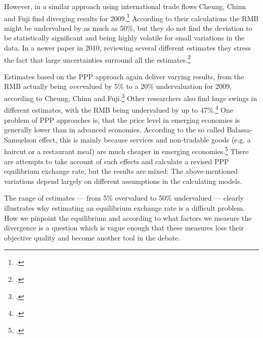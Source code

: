 However, in a similar approach using international trade flows Cheung, 
Chinn and Fuji find diverging results for 
2009.\footnote{\cite{Cheung2009}.} According to their calculations the 
RMB might be undervalued by as much as 50\%, but they do not find the 
deviation to be statistically significant and being highly volatile for 
small variations in the data. In a newer paper in 2010, reviewing 
several different estimates they stress the fact that large 
uncertainties surround all the estimates.\footnote{\cite{Cheung2010}.}

Estimates based on the PPP approach again deliver varying results, from 
the RMB actually being \emph{over}valued by 5\% to a 20\% undervaluation 
for 2009, according to Cheung, Chinn and Fuji.\footnote{\cite[pp.  
82]{Cheung2010}.} Other researchers also find huge swings in different 
estimates, with the RMB being undervalued by up to 
47\%.\footnote{\cite[pp. 72]{Subramanian2010}.} One problem of PPP 
approaches is, that the price level in emerging economies is generally 
lower than in advanced economies. According to the so called 
Balassa-Samuelson effect, this is mainly because services and 
non-tradable goods (e.g. a haircut or a restaurant meal) are much 
cheaper in emerging economies.\footnote{\cite[pp. 57]{Frankel2010}.} 
There are attempts to take account of such effects and calculate a 
revised PPP equilibrium exchange rate, but the results are mixed: The 
above-mentioned variations depend largely on different assumptions in 
the calculating models.

The range of estimates --- from 5\% overvalued to 50\% undervalued --- 
clearly illustrates why estimating an equilibrium exchange rate is a 
difficult problem. How we pinpoint the equilibrium and according to what 
factors we measure the divergence is a question which is vague enough 
that these measures lose their objective quality and become another tool 
in the debate.


